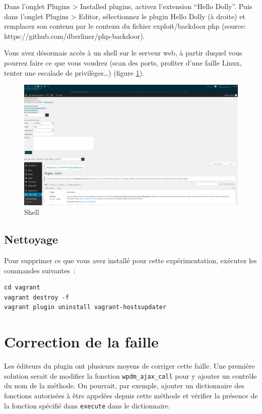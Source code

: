 \documentclass[a4paper,oneside,10pt]{article}
\begin{document}
Dans l’onglet Plugins > Installed plugins, activez l’extension “Hello Dolly”. Puis dans l’onglet Plugins > Editor, sélectionnez le plugin Hello Dolly (à droite) et remplacez son contenu par le contenu du fichier exploit/backdoor.php (source: https://github.com/dberliner/php-backdoor).

Vous avez désormais accès à un shell sur le serveur web, à partir duquel vous pourrez faire ce que vous voudrez (scan des ports, profiter d’une faille Linux, tenter une escalade de privilèges…) (figure \ref{shell}).

\begin{figure}
\centering
\includegraphics[width=\textwidth]{img/shell.png}
\caption{Shell}
\label{shell}
\end{figure}

\subsection{Nettoyage}
Pour supprimer ce que vous avez installé pour cette expérimentation, exécutez les commandes suivantes~:

\begin{verbatim}
cd vagrant
vagrant destroy -f
vagrant plugin uninstall vagrant-hostsupdater
\end{verbatim}

\section{Correction de la faille}
Les éditeurs du plugin ont plusieurs moyens de corriger cette faille. Une première solution serait de modifier la fonction \texttt{wpdm\_ajax\_call} pour y ajouter un contrôle du nom de la méthode. On pourrait, par exemple, ajouter un dictionnaire des fonctions autorisées à être appelées depuis cette méthode et vérifier la présence de la fonction spécifié dans \texttt{execute} dans le dictionnaire. 
\end{document}
